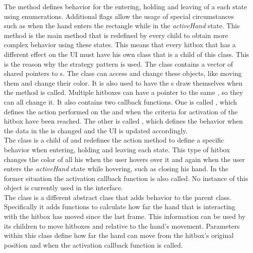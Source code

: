 The  method defines behavior for the entering, holding and leaving of a each state using enumerations. Additional flags allow the usage of special circumstances such as when the hand enters the rectangle while in the \emph{activeHand} state. This  method is the main method that is redefined by every child to obtain more complex behavior using these states. This means that every hitbox that has a different effect on the UI must have his own class that is a child of this class. This is the reason why the strategy pattern is used. The class contains a vector of shared pointers to s. The class can access and change these objects, like moving them and change their color. It is also used to have the s draw themselves when the method  is called. Multiple hitboxes can have a pointer to the same , so they can all change it. It also contains two callback functions. One is called , which defines the action performed on the  and  when the criteria for activation of the hitbox have been reached. The other is called , which defines the behavior when the data in the  is changed and the UI is updated accordingly.\\

The  class is a child of  and redefines the action method to define a specific behavior when entering, holding and leaving each state. This type of hitbox changes the color of all his  when the user hovers over it and again when the user enters the \emph{activeHand} state while hovering, such as closing his hand. In the former situation the activation callback function is also called. No instance of this object is currently used in the interface.\\

The  class is a different abstract class that adds behavior to the parent class. Specifically it adds functions to calculate how far the hand that is interacting with the hitbox has moved since the last frame. This information can be used by its children to move hitboxes and  relative to the hand's movement. Parameters within this class define how far the hand can move from the hitbox's original position and when the activation callback function is called.\\

